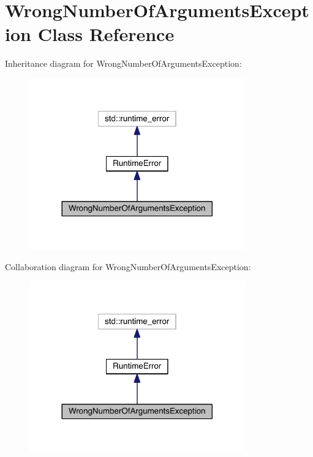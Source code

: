 \hypertarget{class_wrong_number_of_arguments_exception}{}\section{Wrong\+Number\+Of\+Arguments\+Exception Class Reference}
\label{class_wrong_number_of_arguments_exception}


Inheritance diagram for Wrong\+Number\+Of\+Arguments\+Exception\+:
\nopagebreak
\begin{figure}[H]
\begin{center}
\leavevmode
\includegraphics[width=264pt]{d9/de2/class_wrong_number_of_arguments_exception__inherit__graph}
\end{center}
\end{figure}


Collaboration diagram for Wrong\+Number\+Of\+Arguments\+Exception\+:
\nopagebreak
\begin{figure}[H]
\begin{center}
\leavevmode
\includegraphics[width=264pt]{df/d7f/class_wrong_number_of_arguments_exception__coll__graph}
\end{center}
\end{figure}
